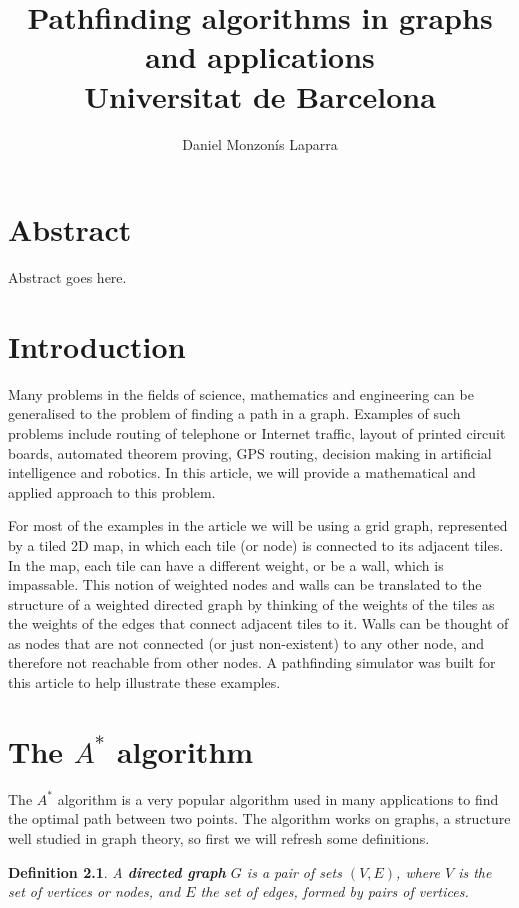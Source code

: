 \documentclass[12pt]{report}
\title{
{Pathfinding algorithms in graphs and applications}\\
{\large Universitat de Barcelona}
}
\author{Daniel Monzonís Laparra}
\newtheorem{definition}[theorem]{Definition}
\begin{document}
\maketitle

\chapter*{Abstract}
Abstract goes here.

\tableofcontents

\chapter{Introduction}
Many problems in the fields of science, mathematics and engineering can be generalised to the problem of finding a path in a graph. Examples of such problems include routing of telephone or Internet traffic, layout of printed circuit boards, automated theorem proving, GPS routing, decision making in artificial intelligence and robotics. In this article, we will provide a mathematical and applied approach to this problem.

For most of the examples in the article we will be using a grid graph, represented by a tiled 2D map, in which each tile (or node) is connected to its adjacent tiles. In the map, each tile can have a different weight, or be a wall, which is impassable. This notion of weighted nodes and walls can be translated to the structure of a weighted directed graph by thinking of the weights of the tiles as the weights of the edges that connect adjacent tiles to it. Walls can be thought of as nodes that are not connected (or just non-existent) to any other node, and therefore not reachable from other nodes. A pathfinding simulator was built for this article to help illustrate these examples.

\chapter{The $A^*$ algorithm}
The $A^*$ algorithm is a very popular algorithm used in many applications to find the optimal path between two points. The algorithm works on graphs, a structure well studied in graph theory, so first we will refresh some definitions.

\begin{definition}
A \textbf{directed graph} $G$ is a pair of sets $(V, E)$, where $V$ is the set of vertices or nodes, and $E$ the set of edges, formed by pairs of vertices.
\end{definition}
\end{document}
